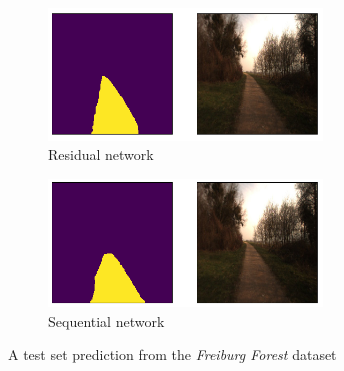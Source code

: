 \documentclass[USenglish]{ifimaster}  %
\begin{document}
\begin{figure}[H]
\centering
\begin{subfigure}[b]{\textwidth}
\centering
\includegraphics[width=0.8\textwidth]{bilder/freiburg/b57-8406_Clipped_res.png}
\caption{Residual network}
\label{fig:ff_res}
\end{subfigure}
\hfill
\begin{subfigure}[b]{\textwidth}
\centering
\includegraphics[width=0.8\textwidth]{bilder/freiburg/b57-8406_Clipped_seq.png}
\caption{Sequential network}
\label{fig:ff_seq}
\end{subfigure}
\caption{A test set prediction from the \textit{Freiburg Forest} dataset}
\end{figure}
\end{document}
